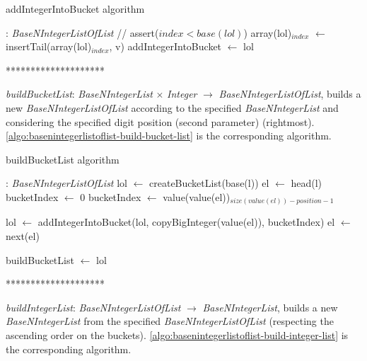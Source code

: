 \documentclass[book, nodocumentinfo]{upmethodology-document}
\newcommand{\separator}{\centerline{********************}}
\begin{document}
\begin{algorithm}[H]
    \caption{addIntegerIntoBucket algorithm}
    \label{algo:basenintegerlistoflist-add-integer-into-bucket}

    \begin{algorithmic}
         : \emph{BaseNIntegerListOfList}
            \State // assert(\(index < base(lol)\))
            \State array(lol)\(_{index}\) \(\leftarrow\) insertTail(array(lol)\(_{index}\), v)
            \State addIntegerIntoBucket \(\leftarrow\) lol
        \EndFunction
    \end{algorithmic}
\end{algorithm}

\separator

\emph{buildBucketList}: \emph{BaseNIntegerList} \(×\) \emph{Integer} \(\rightarrow\) \emph{BaseNIntegerListOfList},
builds a new \emph{BaseNIntegerListOfList} according to the specified \emph{BaseNIntegerList} and considering
the specified digit position (second parameter) (rightmost).
\ref{algo:basenintegerlistoflist-build-bucket-list} is the corresponding algorithm.

\begin{algorithm}[H]
    \caption{buildBucketList algorithm}
    \label{algo:basenintegerlistoflist-build-bucket-list}

    \begin{algorithmic}
         : \emph{BaseNIntegerListOfList}
            \State lol \(\leftarrow\) createBucketList(base(l))
            \State el \(\leftarrow\) head(l)
                \State bucketIndex \(\leftarrow\) 0
                    \State bucketIndex \(\leftarrow\) value(value(el))\(_{size(value(el)) - position - 1}\)
                \EndIf

                \State lol \(\leftarrow\) addIntegerIntoBucket(lol, copyBigInteger(value(el)), bucketIndex)
                \State el \(\leftarrow\) next(el)
            \EndWhile

            \State buildBucketList \(\leftarrow\) lol
        \EndFunction
    \end{algorithmic}
\end{algorithm}

\separator

\emph{buildIntegerList}: \emph{BaseNIntegerListOfList} \(\rightarrow\) \emph{BaseNIntegerList},
builds a new \emph{BaseNIntegerList} from the specified \emph{BaseNIntegerListOfList}
(respecting the ascending order on the buckets).
\ref{algo:basenintegerlistoflist-build-integer-list} is the corresponding algorithm.
\end{document}
